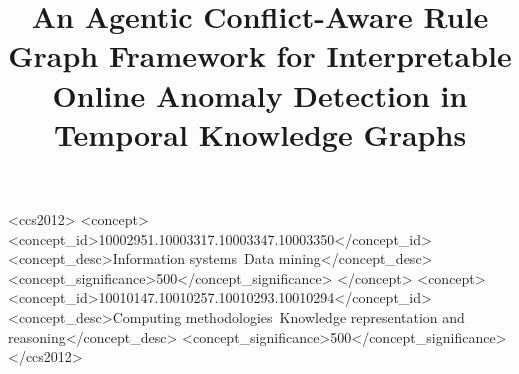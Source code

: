 \documentclass[sigconf,anonymous,review]{acmart}
\title[CARGO-AnoT]{An Agentic Conflict-Aware Rule Graph Framework for Interpretable Online Anomaly Detection in Temporal Knowledge Graphs}
\begin{document}


\begin{CCSXML}
<ccs2012>
  <concept>
    <concept_id>10002951.10003317.10003347.10003350</concept_id>
    <concept_desc>Information systems~Data mining</concept_desc>
    <concept_significance>500</concept_significance>
  </concept>
  <concept>
    <concept_id>10010147.10010257.10010293.10010294</concept_id>
    <concept_desc>Computing methodologies~Knowledge representation and reasoning</concept_desc>
    <concept_significance>500</concept_significance>
</ccs2012>
\end{CCSXML}


\maketitle











\end{document}
